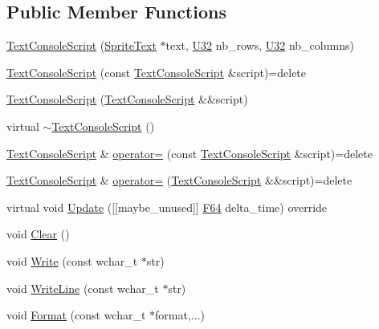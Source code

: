 \subsection*{Public Member Functions}
\begin{DoxyCompactItemize}
\item 
\hyperlink{classmage_1_1script_1_1_text_console_script_afb33cbb74669491151989d957674bca8}{Text\+Console\+Script} (\hyperlink{classmage_1_1_sprite_text}{Sprite\+Text} $\ast$text, \hyperlink{namespacemage_a41c104c036fba3756a74e19f793eeaa1}{U32} nb\+\_\+rows, \hyperlink{namespacemage_a41c104c036fba3756a74e19f793eeaa1}{U32} nb\+\_\+columns)
\item 
\hyperlink{classmage_1_1script_1_1_text_console_script_a6b1085406955c58bac96f798408fb558}{Text\+Console\+Script} (const \hyperlink{classmage_1_1script_1_1_text_console_script}{Text\+Console\+Script} \&script)=delete
\item 
\hyperlink{classmage_1_1script_1_1_text_console_script_ac54103d71cc752e149ecaa98021d2692}{Text\+Console\+Script} (\hyperlink{classmage_1_1script_1_1_text_console_script}{Text\+Console\+Script} \&\&script)
\item 
virtual \hyperlink{classmage_1_1script_1_1_text_console_script_af0959c8a4f21bb4f9b5553dffc5710b9}{$\sim$\+Text\+Console\+Script} ()
\item 
\hyperlink{classmage_1_1script_1_1_text_console_script}{Text\+Console\+Script} \& \hyperlink{classmage_1_1script_1_1_text_console_script_a68af2a144f641c9813b333544fe3562a}{operator=} (const \hyperlink{classmage_1_1script_1_1_text_console_script}{Text\+Console\+Script} \&script)=delete
\item 
\hyperlink{classmage_1_1script_1_1_text_console_script}{Text\+Console\+Script} \& \hyperlink{classmage_1_1script_1_1_text_console_script_ae8560dece8d507ee338dda68e3176fed}{operator=} (\hyperlink{classmage_1_1script_1_1_text_console_script}{Text\+Console\+Script} \&\&script)=delete
\item 
virtual void \hyperlink{classmage_1_1script_1_1_text_console_script_afc3d3099761c9c96b1a87ca07f06ddec}{Update} (\mbox{[}\mbox{[}maybe\+\_\+unused\mbox{]}\mbox{]} \hyperlink{namespacemage_ad26233bbec640deda836e572c1a23708}{F64} delta\+\_\+time) override
\item 
void \hyperlink{classmage_1_1script_1_1_text_console_script_a274764deea9f02ec77515680456548d6}{Clear} ()
\item 
void \hyperlink{classmage_1_1script_1_1_text_console_script_a210034f6226856e44d25c7796c3a2db9}{Write} (const wchar\+\_\+t $\ast$str)
\item 
void \hyperlink{classmage_1_1script_1_1_text_console_script_a5eac390dafa0570785e7a936df0ca0ce}{Write\+Line} (const wchar\+\_\+t $\ast$str)
\item 
void \hyperlink{classmage_1_1script_1_1_text_console_script_a4c956a26976c553a20b4c3b1ec5e9e6b}{Format} (const wchar\+\_\+t $\ast$format,...)
\end{DoxyCompactItemize}
